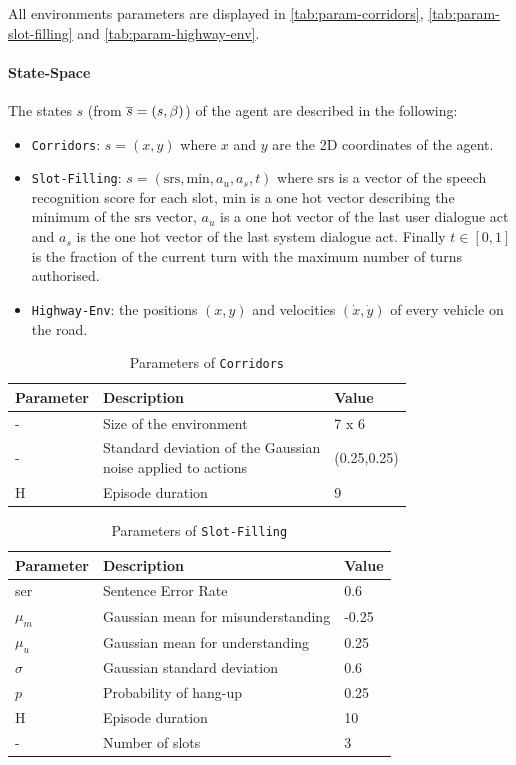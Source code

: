 \begin{subappendices}
All environments parameters are displayed in \autoref{tab:param-corridors}, \autoref{tab:param-slot-filling} and \autoref{tab:param-highway-env}.


\paragraph{State-Space}

The states $s$ (from $\overline{s}=(s,\beta)$) of the agent are described in the following:

\begin{itemize}
	\item \texttt{Corridors}: $s = (x,y)$ where $x$ and $y$ are the 2D coordinates of the agent.
	\item \texttt{Slot-Filling}: $s = (\text{srs},\text{min},a_u,a_s,t)$ where $\text{srs}$ is a vector of the speech recognition score for each slot, $\text{min}$ is a one hot vector describing the minimum of the $\text{srs}$ vector, $a_u$ is a one hot vector of the last user dialogue act and $a_s$ is the one hot vector of the last system dialogue act. Finally $t\in[0,1]$ is the fraction of the current turn with the maximum number of turns authorised.
	\item \texttt{Highway-Env}: the positions $(x, y)$ and velocities $(\dot{x}, \dot{y})$ of every vehicle on the road.
\end{itemize}


\begin{table}[ht!]
	\centering
	\begin{tabular}{lll}
		\toprule
		Parameter & Description & Value\tabularnewline
		\midrule
		- & Size of the environment & 7 x 6\tabularnewline
		- & \makecell[l]{Standard deviation of the Gaussian \\noise applied to actions} & (0.25,0.25)\tabularnewline
		H & Episode duration & 9\tabularnewline
		\bottomrule
	\end{tabular}
	\caption{Parameters of \texttt{Corridors}}
	\label{tab:param-corridors}
\end{table}

\begin{table}[ht!]
	\centering
	\begin{tabular}{lll}
		\toprule
		Parameter & Description & Value\tabularnewline
		\midrule
		ser & Sentence Error Rate & 0.6\tabularnewline
		$\mu_m$& Gaussian mean for misunderstanding & -0.25\tabularnewline
		$\mu_u$& Gaussian mean for understanding & 0.25\tabularnewline
		$\sigma$& Gaussian standard deviation & 0.6\tabularnewline
		$p$& Probability of hang-up & 0.25\tabularnewline
		H & Episode duration & 10\tabularnewline
		- & Number of slots & 3\tabularnewline
		\bottomrule
	\end{tabular}
	\caption{Parameters of \texttt{Slot-Filling}}
	\label{tab:param-slot-filling}
\end{table}



\end{subappendices}
